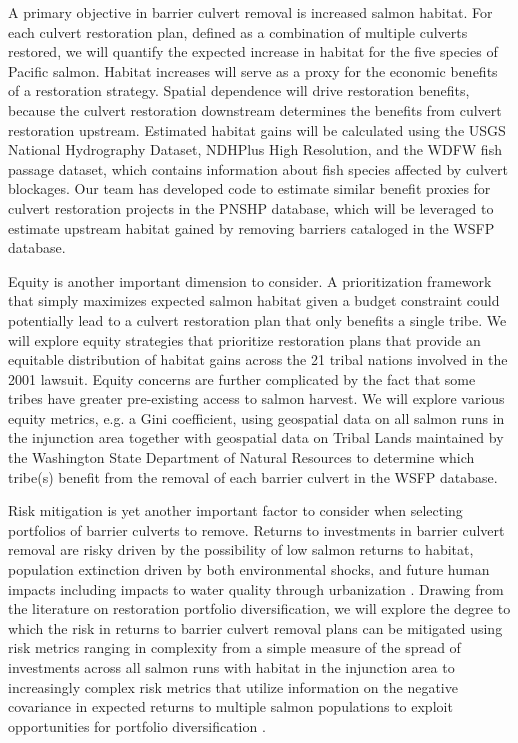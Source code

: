 \documentclass[12pt]{elsarticle}
\begin{document}
A primary objective in barrier culvert removal is increased salmon habitat. For each culvert restoration plan, defined as a combination of multiple culverts restored, we will quantify the expected increase in habitat for the five species of Pacific salmon. Habitat increases will serve as a proxy for the economic benefits of a restoration strategy. Spatial dependence will drive restoration benefits, because the culvert restoration downstream determines the benefits from culvert restoration upstream. Estimated habitat gains will be calculated using the USGS National Hydrography Dataset, NDHPlus High Resolution, and the WDFW fish passage dataset, which contains information about fish species affected by culvert blockages.  Our team has developed code to estimate similar benefit proxies for culvert restoration projects in the PNSHP database, which will be leveraged to estimate upstream habitat gained by removing barriers cataloged in the WSFP database. 

%
Equity is another important dimension to consider. A prioritization framework that simply maximizes expected salmon habitat given a budget constraint could potentially lead to a culvert restoration plan that only benefits a single tribe. We will explore equity strategies that prioritize restoration plans that provide an equitable distribution of habitat gains across the 21 tribal nations involved in the 2001 lawsuit. Equity concerns are further complicated by the fact that some tribes have greater pre-existing access to salmon harvest. We will explore various equity metrics, e.g. a Gini coefficient, using geospatial data on all salmon runs in the injunction area together with geospatial data on Tribal Lands maintained by the Washington State Department of Natural Resources to determine which tribe(s) benefit from the removal of each barrier culvert in the WSFP database. 

%
Risk mitigation is yet another important factor to consider when selecting portfolios of barrier culverts to remove. Returns to investments in barrier culvert removal are risky driven by the possibility of low salmon returns to habitat, population extinction driven by both environmental shocks, and future human impacts including impacts to water quality through urbanization \citep{ettinger2021prioritizing}. Drawing from the literature on restoration portfolio diversification, we will explore the degree to which the risk in returns to barrier culvert removal plans can be mitigated using risk metrics ranging in complexity from a simple measure of the spread of investments across all salmon runs with habitat in the injunction area to increasingly complex risk metrics that utilize information on the negative covariance in expected returns to multiple salmon populations to exploit opportunities for portfolio diversification \citep{sanchirico2008empirical, jardine2015fishermen, johnston2002combining}.  
\end{document}
